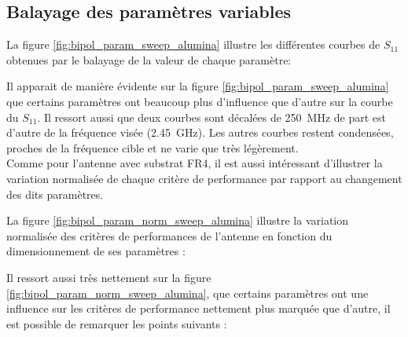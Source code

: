 \documentclass[Deriaz_Traiber_Labo02]{subfiles}
\begin{document}
\subsection{Balayage des paramètres variables}


La figure \ref{fig:bipol_param_sweep_alumina} illustre les différentes courbes de $S_{11}$ obtenues par le balayage de la valeur de chaque paramètre:


Il apparait de manière évidente sur la figure \ref{fig:bipol_param_sweep_alumina} que certains paramètres ont beaucoup plus d'influence que d'autre sur la courbe du $S_{11}$. Il ressort aussi que deux courbes sont décalées de \SI{250}{\mega\hertz} de part est d'autre de la fréquence visée (\SI{2.45}{\giga\hertz}). Les autres courbes restent condensées, proches de la fréquence cible et ne varie que très légèrement.\\

Comme pour l'antenne avec substrat FR4, il est aussi intéressant d'illustrer la variation normalisée de chaque critère de performance par rapport au changement des dits paramètres.\\

\pagebreak

La figure \ref{fig:bipol_param_norm_sweep_alumina} illustre la variation normalisée des critères de performances de l'antenne en fonction du dimensionnement de ses paramètres :


Il ressort aussi très nettement sur la figure \ref{fig:bipol_param_norm_sweep_alumina}, que certains paramètres ont une influence sur les critères de performance nettement plus marquée que d'autre, il est possible de remarquer les points suivants :\\
\end{document}
